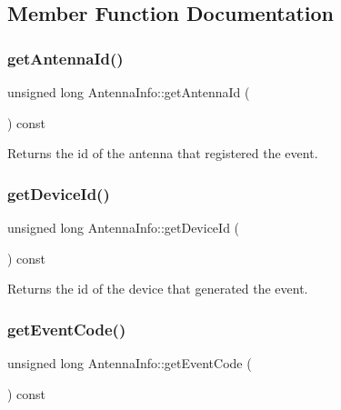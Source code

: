\subsection{Member Function Documentation}
\mbox{\label{class_antenna_info_a1aee619b1f3d45e3da945f17d8531bbf}} 
\subsubsection{\texorpdfstring{getAntennaId()}{getAntennaId()}}
{\footnotesize\ttfamily unsigned long Antenna\+Info\+::get\+Antenna\+Id (\begin{DoxyParamCaption}{ }\end{DoxyParamCaption}) const}

\begin{DoxyReturn}{Returns}
the id of the antenna that registered the event. 
\end{DoxyReturn}
\mbox{\label{class_antenna_info_a25a6a3ca6afeba45c00f2312b8d2d9de}} 
\subsubsection{\texorpdfstring{getDeviceId()}{getDeviceId()}}
{\footnotesize\ttfamily unsigned long Antenna\+Info\+::get\+Device\+Id (\begin{DoxyParamCaption}{ }\end{DoxyParamCaption}) const}

\begin{DoxyReturn}{Returns}
the id of the device that generated the event. 
\end{DoxyReturn}
\mbox{\label{class_antenna_info_a898d46ed6fd2676e370ae8c325ffd679}} 
\subsubsection{\texorpdfstring{getEventCode()}{getEventCode()}}
{\footnotesize\ttfamily unsigned long Antenna\+Info\+::get\+Event\+Code (\begin{DoxyParamCaption}{ }\end{DoxyParamCaption}) const}

